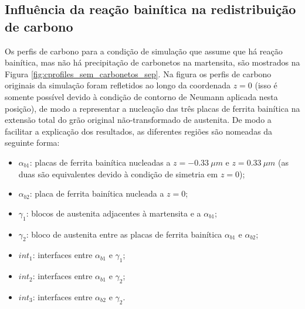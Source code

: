 \subsection{Influência da reação bainítica na redistribuição de carbono}

Os perfis de carbono para a condição de simulação que assume que há reação bainítica, mas não há precipitação de carbonetos na martensita, são mostrados na Figura \ref{fig:cprofiles_sem_carbonetos_sep}. Na figura os perfis de carbono originais da simulação foram refletidos ao longo da coordenada $z = 0$ (isso é somente possível devido à condição de contorno de Neumann aplicada nesta posição), de modo a representar a nucleação das três placas de ferrita bainítica na extensão total do grão original não-transformado de austenita. De modo a facilitar a explicação dos resultados, as diferentes regiões são nomeadas da seguinte forma:

\begin{itemize}
  \item $\alpha_{b1}$: placas de ferrita bainítica nucleadas a $z = \SI{-0.33}{\mu m}$ e $z = \SI{0.33}{\mu m}$ (as duas são equivalentes devido à condição de simetria em $z = 0$);
  \item $\alpha_{b2}$: placa de ferrita bainítica nucleada a $z = 0$;
  \item $\gamma_1$: blocos de austenita adjacentes à martensita e a $\alpha_{b1}$;
  \item $\gamma_2$: bloco de austenita entre as placas de ferrita bainítica $\alpha_{b1}$ e $\alpha_{b2}$;
  \item $int_1$: interfaces entre $\alpha_{b1}$ e $\gamma_1$;
  \item $int_2$: interfaces entre $\alpha_{b1}$ e $\gamma_2$;
  \item $int_3$: interfaces entre $\alpha_{b2}$ e $\gamma_2$.
\end{itemize}

